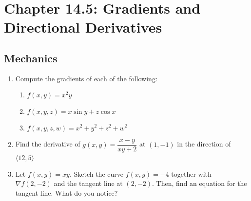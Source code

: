 
\fancyhead[R]{\dayeleven}

\section*{\centering Chapter 14.5: Gradients and Directional Derivatives}
\subsection*{Mechanics}
\begin{enumerate}
    \item Compute the gradients of each of the following: 
    \begin{enumerate}
        \item $f(x,y)=x^2y$
        \item $f(x,y,z)=x\sin y+z\cos x$
        \item $f(x,y,z,w)=x^2+y^2+z^2+w^2$
    \end{enumerate}
    \item Find the derivative of $g(x,y)= \dfrac{x-y}{xy+2}$ at $(1,-1)$ in the direction of $\langle 12, 5\rangle$
    \item Let $f(x,y)=xy$.  Sketch the curve $f(x,y)= -4$ together with $\nabla f(2,-2)$ and the tangent line at $(2,-2)$. Then, find an equation for the tangent line. What do you notice?
\end{enumerate}
